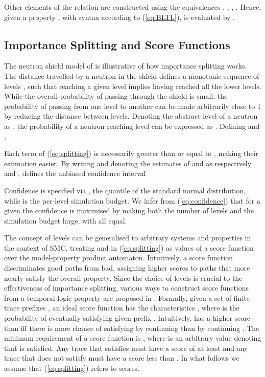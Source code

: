 \documentclass{llncs}
\begin{document}
Other elements of the relation are constructed using the equivalences
, ,
, .
Hence, given a property , with syntax according to (\ref{eq:BLTL}),
 is evaluated by .


\subsection*{Importance Splitting and Score Functions\label{sec:splitting}}

The neutron shield model of \cite{Kahn1950,KahnHarris1951} is illustrative
of how importance splitting works. The distance travelled by a neutron
in the shield defines a monotonic sequence of levels ,
such that reaching a given level implies having reached all the lower
levels. While the overall probability  of passing through
the shield is small, the probability of passing from one level to
another can be made arbitrarily close to 1 by reducing the distance
between levels. Denoting the abstract level of a neutron as ,
the probability of a neutron reaching level  can be expressed
as .
Defining  and ,

Each term of (\ref{eq:splitting}) is necessarily greater than or
equal to , making their estimation easier. By writing 
and denoting the estimates of  and  as respectively
 and , \cite{JegourelLegaySedwards2013}
defines the unbiased confidence interval 

Confidence is specified via , the  quantile
of the standard normal distribution, while  is the per-level simulation
budget. We infer from (\ref{eq:confidence}) that for a given 
the confidence is maximised by making both the number of levels 
and the simulation budget large, with all  equal.

The concept of levels can be generalised to arbitrary systems and
properties in the context of SMC, treating  and  in (\ref{eq:splitting})
as values of a score function over the model-property product automaton.
Intuitively, a score function discriminates good paths from bad, assigning
higher scores to paths that more nearly satisfy the overall property.
Since the choice of levels is crucial to the effectiveness of importance
splitting, various ways to construct score functions from a temporal
logic property are proposed in \cite{JegourelLegaySedwards2013}.
Formally, given a set of finite trace prefixes ,
an ideal score function  has the characteristics
,
where  is the probability of
eventually satisfying  given prefix . Intuitively,
 has a higher score than  iff there is more chance
of satisfying  by continuing  than by continuing
. The minimum requirement of a score function is ,
where  is an arbitrary value denoting that 
is satisfied. Any trace that satisfies  must have a score
of at least  and any trace that does not satisfy 
must have a score less than . In what follows we assume
that (\ref{eq:splitting}) refers to scores.
\end{document}
